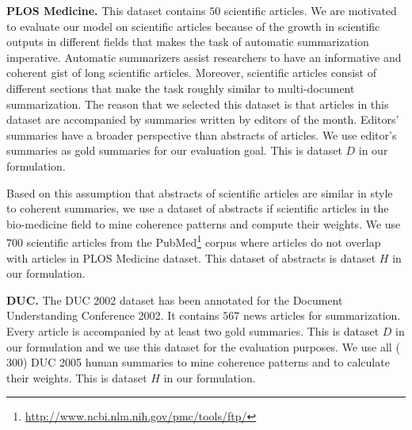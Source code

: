 \textbf{PLOS Medicine. } 
This dataset contains $50$ scientific articles.  
We are motivated to evaluate our model on scientific articles because of the growth in scientific outputs in different fields that makes the task of automatic summarization imperative. 
Automatic summarizers assist researchers to have an informative and coherent gist of long scientific articles. 
Moreover, scientific articles consist of different sections that make the task roughly similar to \mbox{multi-document} summarization. 
The reason that we selected this dataset is that articles in this dataset are accompanied by summaries written by editors of the month. 
Editors' summaries have a broader perspective than abstracts of articles.  
We use editor's summaries as gold summaries for our evaluation goal.
This is dataset $D$  in our formulation.

Based on this assumption that abstracts of scientific articles are similar in style to coherent summaries, 
we use a dataset of abstracts if scientific articles in the \mbox{bio-medicine} field to mine coherence patterns and compute their weights.   
We use $700$ scientific articles from the PubMed\footnote{\url{http://www.ncbi.nlm.nih.gov/pmc/tools/ftp/}} corpus where articles do not overlap with articles in PLOS Medicine dataset. 
This dataset of abstracts is dataset $H$ in our formulation.


\textbf{DUC. } 
The DUC 2002 dataset has been annotated for the Document Understanding Conference 2002. 
It contains $567$ news articles for summarization. 
Every article is accompanied by at least two gold summaries.
This is dataset $D$ in our formulation and we use this dataset for the evaluation purposes. 
We use all ($300$) DUC 2005 human summaries to mine coherence patterns and to calculate their weights. 
This is dataset $H$ in our formulation.


